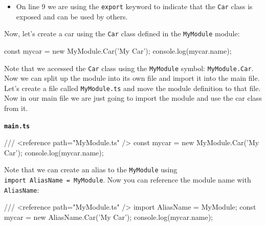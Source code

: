 \documentclass[12pt,]{article}
\newenvironment{Shaded}{}{}
\newcommand{\KeywordTok}[1]{\textcolor[rgb]{0.00,0.00,1.00}{{#1}}}
\newcommand{\DataTypeTok}[1]{{#1}}
\newcommand{\CommentTok}[1]{\textcolor[rgb]{0.00,0.50,0.00}{{#1}}}
\newcommand{\FunctionTok}[1]{{#1}}
\newcommand{\NormalTok}[1]{{#1}}
\providecommand{\tightlist}{%
  \setlength{\itemsep}{0pt}\setlength{\parskip}{0pt}}
\begin{document}
\begin{itemize}
\tightlist
\item
  On line 9 we are using the \texttt{export} keyword to indicate that
  the \texttt{Car} class is exposed and can be used by others.
\end{itemize}

Now, let's create a car using the \texttt{Car} class defined in the
\texttt{MyModule} module:

\begin{Shaded}
\begin{Highlighting}[numbers=left,,]
\DataTypeTok{const} \NormalTok{mycar = }\KeywordTok{new} \NormalTok{MyModule.}\FunctionTok{Car}\NormalTok{('My Car');}
\NormalTok{console.}\FunctionTok{log}\NormalTok{(mycar.}\FunctionTok{name}\NormalTok{);}
\end{Highlighting}
\end{Shaded}

Note that we accessed the \texttt{Car} class using the \texttt{MyModule}
symbol: \texttt{MyModule.Car}. Now we can split up the module into its
own file and import it into the main file. Let's create a file called
\texttt{MyModule.ts} and move the module definition to that file. Now in
our main file we are just going to import the module and use the car
class from it.

\textbf{\texttt{main.ts}}

\begin{Shaded}
\begin{Highlighting}[numbers=left,,]
\CommentTok{/// <reference path="MyModule.ts" />}
\DataTypeTok{const} \NormalTok{mycar = }\KeywordTok{new} \NormalTok{MyModule.}\FunctionTok{Car}\NormalTok{('My Car');}
\NormalTok{console.}\FunctionTok{log}\NormalTok{(mycar.}\FunctionTok{name}\NormalTok{);}
\end{Highlighting}
\end{Shaded}

Note that we can create an alias to the \texttt{MyModule} using
\texttt{import\ AliasName\ =\ MyModule}. Now you can reference the
module name with \texttt{AliasName}:

\begin{Shaded}
\begin{Highlighting}[numbers=left,,]
\CommentTok{/// <reference path="MyModule.ts" />}
\KeywordTok{import AliasName = MyModule;}
\DataTypeTok{const} \NormalTok{mycar = }\KeywordTok{new} \NormalTok{AliasName.}\FunctionTok{Car}\NormalTok{('My Car');}
\NormalTok{console.}\FunctionTok{log}\NormalTok{(mycar.}\FunctionTok{name}\NormalTok{);}
\end{Highlighting}
\end{Shaded}
\end{document}
